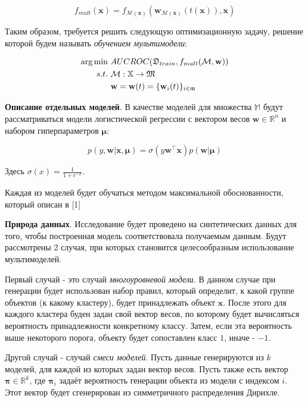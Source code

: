 \documentclass[12pt,twoside]{article}
\begin{document}
$$ f_{mult}(\mathbf{x}) = f_{\mathcal{M}(\mathbf{x})}(\mathbf{w}_{\mathcal{M}(\mathbf{x})}(t(\mathbf{x})), \mathbf{x}) $$

Таким образом, требуется решить следующую оптимизационную задачу, решение которой будем называть \emph{обучением мультимодели}:

\begin{align*}
\arg\min&\ AUC\-ROC(\mathfrak{D}_{train}, f_{mult}(\mathcal{M}, \mathbf{w})) \\
    s.t.&\ \mathcal{M}: \mathbb{X} \rightarrow \mathfrak{M} \\
        &\ \mathbf{w} = \mathbf{w}(t) = \{\mathbf{w}_i(t)\}_{i \in \mathfrak{m}}
\end{align*}

\textbf{Описание отдельных моделей}. В качестве моделей для множества $\mathbb{M}$ будут рассматриваться модели логистической регрессии с вектором весов $\mathbf{w} \in \mathbb{R}^n$ и набором гиперпараметров $\mathbf{\mu}$:

$$ p(y, \mathbf{w} | \mathbf{x}, \mathbf{\mu}) = \sigma(y\mathbf{w}^\top \mathbf{x})p(\mathbf{w} | \mathbf{\mu}) $$

Здесь $\sigma(x) = \frac{1}{1 + e^{-x}}$.

Каждая из моделей будет обучаться методом максимальной обоснованности, который описан в [1]

\bigskip
\textbf{Природа данных}. Исследование будет проведено на синтетических данных для того, чтобы построенная модель соответствовала получаемым данным. Будут рассмотрены 2 случая, при которых становится целесообразным использование мультимоделей.

Первый случай - это случай \emph{многоуровневой модели}. В данном случае при генерации будет использован набор правил, который определит, к какой группе объектов (к какому кластеру), будет принадлежать объект $\mathbf{x}$. После этого для каждого кластера буден задан свой вектор весов, по которому будет вычисляться вероятность принадлежности конкретному классу. Затем, если эта вероятность выше некоторого порога, объекту будет сопоставлен класс $1$, иначе - $-1$.

Другой случай - случай \emph{смеси моделей}. Пусть данные генерируются из $k$ моделей, для каждой из которых задан вектор весов. Пусть также есть вектор $\mathbf{\pi} \in \mathbb{R}^k$, где $\mathbf{\pi}_i$ задаёт вероятность генерации объекта из модели с индексом $i$. Этот вектор будет сгенерирован из симметричного распределения Дирихле.
\end{document}
